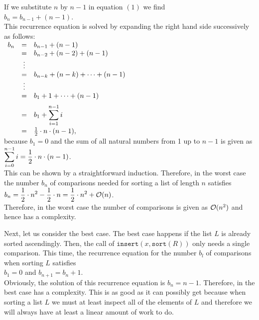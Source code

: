 If we substitute $n$ by $n-1$ in equation $(1)$ we find
\\[0.2cm]
\hspace*{1.3cm}
$b_n = b_{n-1} + (n - 1)$.
\\[0.2cm]
This recurrence equation is solved by expanding the right hand side successively as follows:
\\[0.2cm]
\hspace*{1.3cm}
$
\begin{array}[t]{lcl}
  b_{n} & = & b_{n-1} + (n - 1)                     \\ 
        & = & b_{n-2} + (n - 2) + (n - 1)           \\ 
        & \vdots &                                  \\
        & = & b_{n-k} + (n - k) + \cdots + (n - 1)  \\ 
        & \vdots &                                  \\
        & = & b_{1} + 1 + \cdots + (n - 1)      \\[0.2cm] 
        & = & \displaystyle b_{1} + \sum\limits_{i = 1}^{n - 1} i \\[0.4cm]
        & = & \frac{1}{2} \cdot n \cdot (n - 1),
\end{array}
$
\\[0.2cm]
because $b_1 = 0$ and the sum of all natural numbers from 1 up to  $n - 1$ is given as
\\[0.2cm]
\hspace*{1.3cm}
$\displaystyle\sum\limits_{i = 0}^{n - 1} i  = \frac{1}{2} \cdot n \cdot (n - 1)$.
\\[0.2cm]
This can be shown by a straightforward induction.  Therefore, in the worst case the number $b_n$ of
comparisons needed for sorting a list of length $n$  satisfies 
\\[0.2cm]
\hspace*{1.3cm}
$\displaystyle b_n = \frac{1}{2} \cdot n^2 - \frac{1}{2} \cdot n = \frac{1}{2} \cdot n^2 + \mathcal{O}(n)$.
\\[0.2cm]
Therefore, in the worst case the number of comparisons is given as $\mathcal{O}(n^2)$ and hence
 has a  complexity.


Next, let us consider the best case.  The best case happens if the list $L$ is already sorted
ascendingly.  Then, the call of 
$\mathtt{insert}(x,\mathtt{sort}(R))$ only needs a single comparison.  This time, the recurrence
equation for the number $b_l$ of comparisons when sorting $L$ satisfies
 \\[0.2cm]
\hspace*{1.3cm}
$b_1 = 0$ \quad and \quad $b_{n+1} = b_n + 1$. 
\\[0.2cm]
Obviously, the solution of this recurrence equation is $b_n = n-1$.  Therefore, in the best case
 has a  complexity.  This is as good as it can possibly get because when
sorting a list $L$ we must at least inspect all of the elements of $L$ and therefore we will always have at
least a linear amount of work to do.


